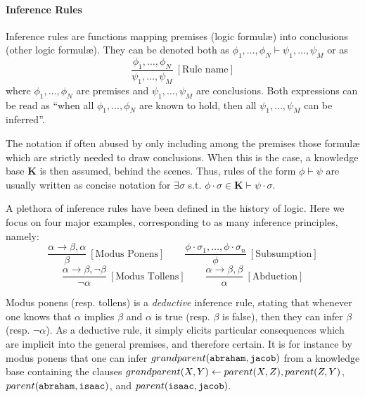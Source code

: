 \documentclass[12pt,a4paper,openright,twoside]{book}
\begin{document}
\paragraph{Inference Rules}

Inference rules are functions mapping premises (logic formul\ae{}) into conclusions (other logic formul\ae{}).
%
They can be denoted both as $\phi_1, \ldots, \phi_N \vdash \psi_1, \ldots, \psi_M$ or as
%
\begin{equation*}
    \frac{\phi_1, \ldots, \phi_N}{\psi_1, \ldots, \psi_M} ~ [\text{Rule name}]
\end{equation*}
%
where $\phi_1, \ldots, \phi_N$ are premises and $\psi_1, \ldots, \psi_M$ are conclusions.
%
Both expressions can be read as ``when all $\phi_1, \ldots, \phi_N$ are known to hold, then all $\psi_1, \ldots, \psi_M$ can be inferred''.

The notation if often abused by only including among the premises those formul\ae{} which are strictly needed to draw conclusions.
%
When this is the case, a knowledge base $\mathbf{K}$ is then assumed, behind the scenes.
%
Thus, rules of the form $\phi \vdash \psi$ are usually written as concise notation for $\exists \sigma$ s.t. $\phi \cdot \sigma \in \mathbf{K} \vdash \psi \cdot \sigma$.

A plethora of inference rules have been defined in the history of logic.
%
Here we focus on four major examples, corresponding to as many inference principles, namely:
%
\begin{equation*}
    \frac{\alpha \rightarrow \beta, \alpha}{\beta} ~ [\text{Modus Ponens}]
    \qquad
    \frac{\phi\cdot\sigma_1, \ldots, \phi\cdot\sigma_n}{\phi} ~ [\text{Subsumption}]
\end{equation*}
\begin{equation*}
    \frac{\alpha \rightarrow \beta, \lnot\beta}{\lnot\alpha} ~ [\text{Modus Tollens}]
    \qquad
    \frac{\alpha \rightarrow \beta, \beta}{\alpha} ~ [\text{Abduction}]
\end{equation*}

Modus ponens (resp. tollens) is a \emph{deductive} inference rule, stating that whenever one knows that $\alpha$ implies $\beta$ and $\alpha$ is true (resp. $\beta$ is false), then they can infer $\beta$ (resp. $\lnot\alpha$).
%
As a deductive rule, it simply elicits particular consequences which are implicit into the general premises, and therefore certain.
%
It is for instance by modus ponens that one can infer $grand\-pa\-rent(\mathtt{abraham}, \mathtt{jacob})$ from a knowledge base containing the clauses $grand\-pa\-rent(X, Y) \leftarrow parent(X, Z), parent(Z, Y)$, $parent(\mathtt{abraham}, \mathtt{isaac})$, and $pa\-rent(\mathtt{isa\-ac}, \mathtt{ja\-cob})$.
\end{document}
